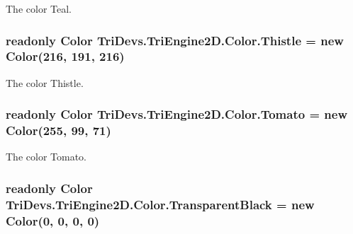 The color Teal. 

\hypertarget{struct_tri_devs_1_1_tri_engine2_d_1_1_color_a689be45b11842d69956123fd41044157}{
\subsubsection[{Thistle}]{\setlength{\rightskip}{0pt plus 5cm}readonly {\bf Color} Tri\-Devs.\-Tri\-Engine2\-D.\-Color.\-Thistle = new {\bf Color}(216, 191, 216)\hspace{0.3cm}{\ttfamily [static]}}}\label{struct_tri_devs_1_1_tri_engine2_d_1_1_color_a689be45b11842d69956123fd41044157}


The color Thistle. 

\hypertarget{struct_tri_devs_1_1_tri_engine2_d_1_1_color_aac28de6c8573d9b47ec0fb4dc6c6ee43}{
\subsubsection[{Tomato}]{\setlength{\rightskip}{0pt plus 5cm}readonly {\bf Color} Tri\-Devs.\-Tri\-Engine2\-D.\-Color.\-Tomato = new {\bf Color}(255, 99, 71)\hspace{0.3cm}{\ttfamily [static]}}}\label{struct_tri_devs_1_1_tri_engine2_d_1_1_color_aac28de6c8573d9b47ec0fb4dc6c6ee43}


The color Tomato. 

\hypertarget{struct_tri_devs_1_1_tri_engine2_d_1_1_color_aa4b89fdc2c8f9165421cc213e766a333}{
\subsubsection[{Transparent\-Black}]{\setlength{\rightskip}{0pt plus 5cm}readonly {\bf Color} Tri\-Devs.\-Tri\-Engine2\-D.\-Color.\-Transparent\-Black = new {\bf Color}(0, 0, 0, 0)\hspace{0.3cm}{\ttfamily [static]}}}\label{struct_tri_devs_1_1_tri_engine2_d_1_1_color_aa4b89fdc2c8f9165421cc213e766a333}



